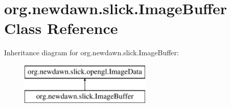 \hypertarget{classorg_1_1newdawn_1_1slick_1_1_image_buffer}{}\section{org.\+newdawn.\+slick.\+Image\+Buffer Class Reference}
\label{classorg_1_1newdawn_1_1slick_1_1_image_buffer}
Inheritance diagram for org.\+newdawn.\+slick.\+Image\+Buffer\+:\begin{figure}[H]
\begin{center}
\leavevmode
\includegraphics[height=2.000000cm]{classorg_1_1newdawn_1_1slick_1_1_image_buffer}
\end{center}
\end{figure}
